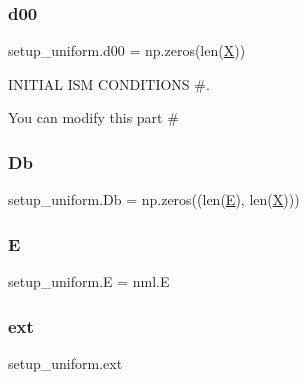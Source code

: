 \mbox{\label{namespacesetup__uniform_ab935e9202453472265e56efe216f4985}} 
\subsubsection{\texorpdfstring{d00}{d00}}
{\footnotesize\ttfamily setup\+\_\+uniform.\+d00 = np.\+zeros(len(\hyperlink{namespacesetup__uniform_a6d0e53624e475055c31146a2ff8d762c}{X}))}



I\+N\+I\+T\+I\+AL I\+SM C\+O\+N\+D\+I\+T\+I\+O\+NS \#. 

You can modify this part \# \mbox{\label{namespacesetup__uniform_af3270641f1a828a24a4e92605315fcf3}} 
\subsubsection{\texorpdfstring{Db}{Db}}
{\footnotesize\ttfamily setup\+\_\+uniform.\+Db = np.\+zeros((len(\hyperlink{namespacesetup__uniform_a05accd2e8ab1c28d2f58f024c9a64fac}{E}), len(\hyperlink{namespacesetup__uniform_a6d0e53624e475055c31146a2ff8d762c}{X})))}

\mbox{\label{namespacesetup__uniform_a05accd2e8ab1c28d2f58f024c9a64fac}} 
\subsubsection{\texorpdfstring{E}{E}}
{\footnotesize\ttfamily setup\+\_\+uniform.\+E = nml.\+E}

\mbox{\label{namespacesetup__uniform_a4db2f3dc20837fb505582ea74cf06bdf}} 
\subsubsection{\texorpdfstring{ext}{ext}}
{\footnotesize\ttfamily setup\+\_\+uniform.\+ext}


